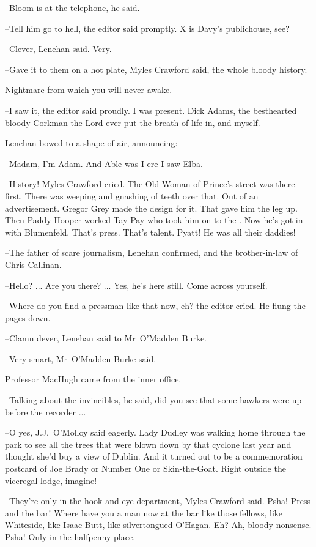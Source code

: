 --Bloom is at the telephone,
he said.

--Tell him go to hell,
the editor said promptly.
X is Davy's publichouse,
see?



--Clever,
Lenehan said.
Very.

--Gave it to them on a hot plate,
Myles Crawford said,
the whole bloody history.

Nightmare from which you will never awake.

--I saw it,
the editor said proudly.
I was present.
Dick Adams, the besthearted bloody Corkman the Lord ever put the breath of life in,
and myself.

Lenehan bowed to a shape of air,
announcing:

--Madam,
I'm Adam.
And Able was I ere I saw Elba.

--History!
Myles Crawford cried.
The Old Woman of Prince's street was there first.
There was weeping and gnashing of teeth over that.
Out of an advertisement.
Gregor Grey made the design for it.
That gave him the leg up.
Then Paddy Hooper worked Tay Pay who took him on to the .
Now he's got in with Blumenfeld.
That's press.
That's talent.
Pyatt!
He was all their daddies!

--The father of scare journalism,
Lenehan confirmed,
and the brother-in-law of Chris Callinan.

--Hello? ...
Are you there? ...
Yes, he's here still.
Come across yourself.

--Where do you find a pressman like that now, eh?
the editor cried.
He flung the pages down.

--Clamn dever,
Lenehan said to Mr~O'Madden Burke.

--Very smart,
Mr~O'Madden Burke said.

Professor MacHugh came from the inner office.

--Talking about the invincibles,
he said,
did you see that some hawkers were up before the recorder ...

--O yes,
J.J.~O'Molloy said eagerly.
Lady Dudley was walking home through the park
to see all the trees that were blown down by that cyclone last year
and thought she'd buy a view of Dublin.
And it turned out to be a commemoration postcard
of Joe Brady or Number One or Skin-the-Goat.
Right outside the viceregal lodge,
imagine!

--They're only in the hook and eye department,
Myles Crawford said.
Psha!
Press and the bar!
Where have you a man now at the bar like those fellows,
like Whiteside,
like Isaac Butt,
like silvertongued O'Hagan.
Eh?
Ah, bloody nonsense.
Psha!
Only in the halfpenny place.

